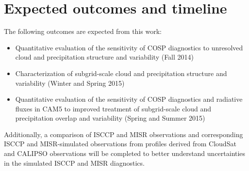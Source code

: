 \documentclass[letter]{article}
\begin{document}


\section{Expected outcomes and timeline}
The following outcomes are expected from this work:
\begin{itemize}
    \item Quantitative evaluation of the sensitivity of COSP diagnostics to unresolved cloud and precipitation structure and variability (Fall 2014)
    \item Characterization of subgrid-scale cloud and precipitation structure and variability (Winter and Spring 2015)
    \item Quantitative evaluation of the sensitivity of COSP diagnostics and radiative fluxes in CAM5 to improved treatment of subgrid-scale cloud and precipitation overlap and variability (Spring and Summer 2015)
\end{itemize}
Additionally, a comparison of ISCCP and MISR observations and corresponding ISCCP and MISR-simulated observations from profiles derived from CloudSat and CALIPSO observations will be completed to better understand uncertainties in the simulated ISCCP and MISR diagnostics.
\end{document}
